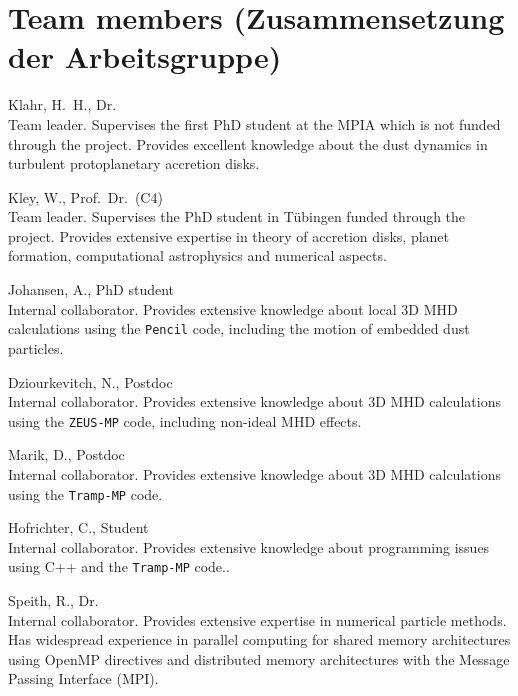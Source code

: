 \section{Team members (Zusammensetzung der Arbeitsgruppe)}
%
%
\begin{teamlist}
\item[Klahr, H.~H., Dr.]\mbox{}\\
Team leader. Supervises the first PhD student at the MPIA which is
not funded through the project.
Provides excellent knowledge about the dust dynamics in turbulent
protoplanetary accretion disks.
\item[Kley, W., Prof.~Dr.~(C4)]\mbox{}\\
Team leader. Supervises the PhD student in T\"ubingen
funded through the project. Provides extensive expertise in
theory of accretion disks, planet formation, computational astrophysics
and numerical aspects.
\item[Johansen, A., PhD student]\mbox{}\\
Internal collaborator. Provides extensive knowledge about local
3D MHD calculations using the {\tt Pencil} code, including the
motion of embedded dust particles.
\item[Dziourkevitch, N., Postdoc]\mbox{}\\
Internal collaborator. Provides extensive knowledge about
3D MHD calculations using the {\tt ZEUS-MP} code, including 
non-ideal MHD effects.
\item[Marik, D., Postdoc]\mbox{}\\
Internal collaborator. Provides extensive knowledge about
3D MHD calculations using the {\tt Tramp-MP} code.
\item[Hofrichter, C., Student]\mbox{}\\
Internal collaborator. Provides extensive knowledge about
programming issues using C++ and the {\tt Tramp-MP} code..
\item[Speith, R., Dr.]\mbox{}\\
Internal collaborator. Provides extensive expertise in numerical particle methods.
Has widespread experience in parallel computing for
shared memory architectures using OpenMP directives and distributed
memory architectures with the Message Passing Interface (MPI).
\end{teamlist}
\vspace{1em}
%
